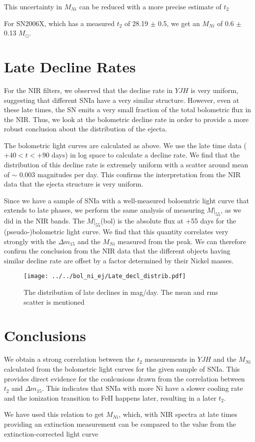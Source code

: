 \documentclass{article}
\begin{document}
This uncertainty in $M_{Ni}$ can be reduced with a more precise estimate of $t_2$

For SN2006X, which has a measured $t_2$ of 28.19 $\pm$ 0.5, we get an $M_{Ni}$ of 0.6 $\pm$ 0.13 $M_{\odot}$. 

\section{Late Decline Rates}
For the NIR filters, we observed that the decline rate in $YJH$ is very uniform, suggesting that different SNIa have a very similar structure. However, even at these late times, the SN emits a very small fraction of the total bolometric flux in the NIR. Thus, we look at the bolometric decline rate in order to provide a more robust conclusion about the distribution of the ejecta.

The bolometric light curves are calculated as above. We use the late time data ($+40<t<+90$ days) in log space to calculate a decline rate. We find that the distribution of this decline rate is extremely uniform with a scatter around mean of $\sim$ 0.003 magnitudes per day. This confirms the interpretation from the NIR data that the ejecta structure is very uniform.

Since we have a sample of SNIa with a well-measured boloemtric light curve that extends to late phases, we perform the same analysis of measuring $M|_{55}$, as we did in the NIR bands. The $M|_{55}$(bol) is the absolute flux at +55 days for the (pseudo-)bolometric light curve. We find that this quantity correlates very strongly with the $\Delta m_{15}$ and the $M_{Ni}$ measured from the peak. We can therefore confirm the conclusion from the NIR data that the different objects having similar decline rate are offset by a factor determined by their Nickel masses.
\begin{figure}
\texttt{[image: ../../bol\_ni\_ej/Late\_decl\_distrib.pdf]}
\caption{The distribution of late declines in mag/day. The mean and rms scatter is mentioned}
\label{fig:decl}
\end{figure}

\section{Conclusions}
We obtain a strong correlation between the $t_2$ measurements in $YJH$ and the $M_{Ni}$ calculated from the bolometric light curves for the given sample of SNIa. This provides direct evidence for the conlcusions drawn from the correlation between $t_2$ and $\Delta m_{15}$. This indicates that SNIa with more Ni have a slower cooling rate and the ionization transition to FeII happens later, resulting in a later $t_2$.


We have used this relation to get $M_{Ni}$, which, with NIR spectra at late times providing an extinction measurement can be compared to the value from the extinction-corrected light curve
\end{document}
